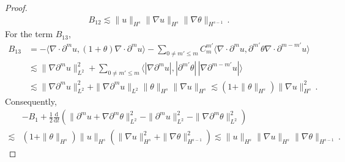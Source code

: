 \documentclass[reqno,11pt]{amsart}
\numberwithin{equation}{section}
\def\p{\partial}
\def\d{\mathrm{d}}
\begin{document}
\begin{proof}
\begin{equation*}
\begin{aligned}
B_{12} \lesssim\| u \|_{H^s} \| \nabla u \|_{H^{s}} \| \nabla \theta \|_{H^{s-1}} \,.
\end{aligned}
\end{equation*}
For the term $B_{13}$,
\begin{equation*}
\begin{aligned}
B_{13} & = -\langle \nabla \cdot \partial^m u, (1+\theta) \nabla \cdot \partial^m u \rangle - \sum_{0 \neq m' \leq m} C_m^{m'} \langle \nabla \cdot \partial^m u, \partial^{m'} \theta  \nabla \cdot\partial^{m - m'} u \rangle \\
&\lesssim \| \nabla \partial^m u \|_{L^2}^2 + \sum_{0 \neq m' \leq m} \langle |\nabla \partial^m u|, |\partial^{m'} \theta| \, |\nabla \partial^{m - m'} u| \rangle \\
&\lesssim \| \nabla \partial^m u \|_{L^2}^2 + \| \nabla \partial^m u \|_{L^2} \| \theta \|_{H^s} \| \nabla u \|_{H^s} \lesssim (1 + \| \theta \|_{H^s}) \| \nabla u \|_{H^s}^2 \,.
\end{aligned}
\end{equation*}
Consequently, 
\begin{equation}\label{theta-eq2}
\begin{aligned}
& - B_1 + \frac{1}{2} \frac{\d}{\d t} \left( \| \p^m u + \nabla \partial^m \theta \|_{L^2}^2 - \| \p^m u \|_{L^2}^2 - \| \nabla \partial^m \theta \|_{L^2}^2 \right) \\
\lesssim & ( 1 + \| \theta \|_{H^s}) \| u \|_{H^s} \left( \| \nabla u \|_{H^s}^2 + \| \nabla \theta \|_{H^{s-1}}^2 \right) \lesssim\| u \|_{H^s} \| \nabla u \|_{H^{s}} \| \nabla \theta \|_{H^{s-1}} \,.
\end{aligned}
\end{equation}


\end{proof}
\end{document}
